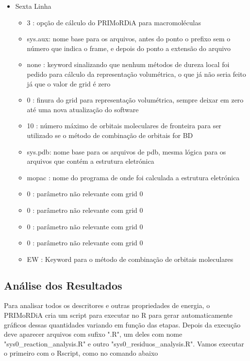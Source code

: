 \documentclass[a4paper,11pt]{refart}
\begin{document}
\begin{itemize}
\begin{itemize}
	\end{itemize}
	\item Sexta Linha 
	\begin{itemize}
	\item 3      : opção de cálculo do PRIMoRDiA para macromoléculas
	\item sys.aux: nome base para os arquivos, antes do ponto o prefixo sem o número que indica o frame, e depois do ponto a extensão do arquivo
	\item none   : keyword sinalizando que nenhum métodos de dureza local foi pedido para cálculo da representação volumétrica, o que já não seria feito já que o valor de grid é zero
	\item 0      : finura do grid para representação volumétrica, sempre deixar em zero até uma nova atualização do software
	\item 10     : número máximo de orbitais moleculares de fronteira para ser utilizado se o método de combinação de orbitais for BD
	\item sys.pdb: nome base para os arquivos de pdb, mesma lógica para os arquivos que contém a estrutura eletrónica
	\item mopac  : nome do programa de onde foi calculada a estrutura eletrónica
	\item 0      : parâmetro não relevante com grid 0
	\item 0      : parâmetro não relevante com grid 0
	\item 0      : parâmetro não relevante com grid 0
	\item 0      : parâmetro não relevante com grid 0
	\item EW     : Keyword para o método de combinação de orbitais moleculares
	\end{itemize}
\end{itemize}

\subsection{Análise dos Resultados}

Para analisar todos os descritores e outras propriedades de energia, o PRIMoRDiA cria um script para executar no R para gerar automaticamente gráficos dessas quantidades variando em função das etapas. Depois da execução deve aparecer arquivos com sufixo ".R", um deles com nome "sys0\_reaction\_analysis.R" e outro "sys0\_residuos\_analysis.R". Vamos executar o primeiro com o Rscript, como no comando abaixo
\end{document}
